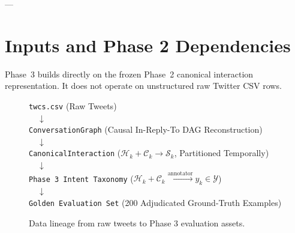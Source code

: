 \documentclass[11pt,a4paper]{article}
\begin{document}
---

\section{Inputs and Phase 2 Dependencies}

Phase~3 builds directly on the frozen Phase~2 canonical interaction representation. It does not operate on unstructured raw Twitter CSV rows.

\begin{figure}[ht]
\centering
\begin{tcolorbox}[colback=blue!5,colframe=blue!40!black,title=\textbf{Information Boundary Flow}]
\texttt{twcs.csv} (Raw Tweets) \\
$\quad \downarrow$ \\
\texttt{ConversationGraph} (Causal In-Reply-To DAG Reconstruction) \\
$\quad \downarrow$ \\
\texttt{CanonicalInteraction} ($\mathcal{H}_k + \mathcal{C}_k \rightarrow \mathcal{S}_k$, Partitioned Temporally) \\
$\quad \downarrow$ \\
\texttt{Phase 3 Intent Taxonomy} ($\mathcal{H}_k + \mathcal{C}_k \xrightarrow{\text{annotator}} y_k \in \mathcal{Y}$) \\
$\quad \downarrow$ \\
\texttt{Golden Evaluation Set} (200 Adjudicated Ground-Truth Examples)
\end{tcolorbox}
\caption{Data lineage from raw tweets to Phase 3 evaluation assets.}
\label{fig:data_lineage}
\end{figure}
\end{document}
